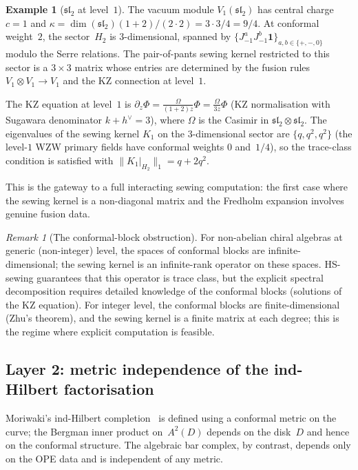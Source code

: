 \documentclass[11pt,reqno]{amsart}
\theoremstyle{definition}
\newtheorem{example}[theorem]{Example}
\theoremstyle{remark}
\newtheorem{remark}[theorem]{Remark}
\numberwithin{equation}{section}
\begin{document}
\begin{example}[$\mathfrak{sl}_2$ at level~$1$]
\label{ex:sl2-level1}
The vacuum module $V_1(\mathfrak{sl}_2)$ has central charge
$c = 1$ and $\kappa = \dim(\mathfrak{sl}_2)(1+2)/(2\cdot 2)
= 3 \cdot 3/4 = 9/4$.  At conformal weight~$2$, the
sector~$H_2$ is $3$-dimensional, spanned by
$\{J^a_{-1}J^b_{-1}\mathbf{1}\}_{a,b \in \{+,-,0\}}$
modulo the Serre relations.  The pair-of-pants sewing kernel
restricted to this sector is a $3 \times 3$ matrix whose
entries are determined by the fusion rules
$V_1 \otimes V_1 \to V_1$ and the KZ connection at level~$1$.

The KZ equation at level~$1$ is
$\partial_z \Phi = \frac{\Omega}{(1+2)z}\Phi
= \frac{\Omega}{3z}\Phi$
(KZ normalisation with Sugawara denominator $k + h^\vee = 3$),
where $\Omega$ is the Casimir in $\mathfrak{sl}_2 \otimes
\mathfrak{sl}_2$.  The eigenvalues of the sewing kernel
$K_1$ on the $3$-dimensional sector are
$\{q, q^2, q^2\}$ (the level-$1$ WZW primary fields have
conformal weights $0$ and~$1/4$), so the trace-class condition
is satisfied with
$\|K_1|_{H_2}\|_1 = q + 2q^2$.

This is the gateway to a full interacting sewing
computation: the first case where the sewing kernel is a
non-diagonal matrix and the Fredholm expansion involves
genuine fusion data.
\end{example}

\begin{remark}[The conformal-block
 obstruction]\label{rem:conformal-block-obstruction}
For non-abelian chiral algebras at generic (non-integer) level,
the spaces of conformal blocks are infinite-dimensional; the
sewing kernel is an infinite-rank operator on these spaces.
HS-sewing guarantees that this operator is trace class, but the
explicit spectral decomposition requires detailed knowledge of
the conformal blocks (solutions of the KZ equation).  For
integer level, the conformal blocks are finite-dimensional
(Zhu's theorem), and the sewing kernel is a finite matrix at
each degree; this is the regime where explicit computation is
feasible.
\end{remark}

\subsection{Layer 2: metric independence of the ind-Hilbert
 factorisation}\label{subsec:gap-layer2}

Moriwaki's ind-Hilbert completion~\cite{Moriwaki26b} is defined
using a conformal metric on the curve; the Bergman inner product
on~$A^2(D)$ depends on the disk~$D$ and hence on the
conformal structure.  The algebraic bar complex, by contrast,
depends only on the OPE data and is independent of any metric.
\end{document}
